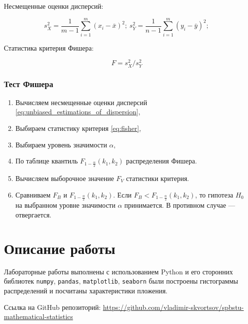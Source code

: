 \documentclass[12pt,a4paper]{article}
\begin{document}
	Несмещенные оценки дисперсий:

	\begin{equation} \label{eq:unbiased_estimations_of_dispersion}
		s_X^2 = \frac{1}{m - 1} \sum_{i=1}^m (x_i - \bar x)^2; \
		s_Y^2 = \frac{1}{n - 1} \sum_{i=1}^m (y_i - \bar y)^2;
	\end{equation}

	Статистика критерия Фишера:

	\begin{equation} \label{eq:fisher}
		F = s_X^2 / s_Y^2
	\end{equation}

	\subsubsection{Тест Фишера}

	\begin{enumerate}
		\item Вычисляем несмещенные оценки дисперсий
			\eqref{eq:unbiased_estimations_of_dispersion},
		\item Выбираем статистику критерия \eqref{eq:fisher},
		\item Выбираем уровень значимости \( \alpha \),
		\item По таблице квантиль \( F_{1 - \frac{\alpha}{2}} (k_1, k_2) \)
			распределения Фишера.
		\item Вычисляем выборочное значение \( F_V \) статистики критерия.
		\item Сравниваем \( F_B \) и \( F_{1 - \frac{\alpha}{2}} (k_1, k_2) \).
			Если \( F_B < F_{1 - \frac{\alpha}{2}} (k_1, k_2) \), то гипотеза
			\( H_0 \) на выбранном уровне значимости \( \alpha \) принимается.
			В противном случае — отвергается.
	\end{enumerate}

	\section{Описание работы}

	Лабораторные работы выполнены с использованием Python и его сторонних
	библиотек \verb!numpy!, \verb!pandas!, \verb!matplotlib!, \verb!seaborn! были
	построены гистограммы распределений и посчитаны характеристики пложения.

	Ссылка на GitHub репозиторий:
	\href{https://github.com/vladimir-skvortsov/spbstu-mathematical-statistics}
	{https://github.com/vladimir-skvortsov/spbstu-mathematical-statistics}
\end{document}
